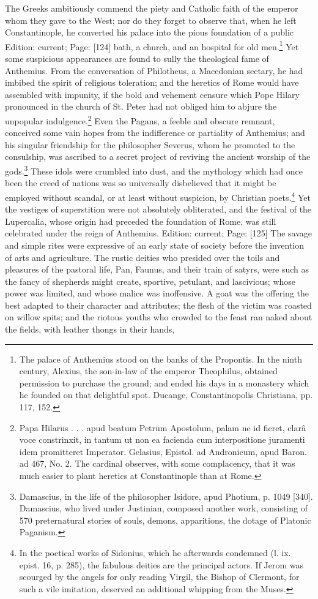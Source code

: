 The Greeks ambitiously commend the piety and Catholic faith of the emperor whom they gave to the West; nor do they forget to observe that, when he left Constantinople, he converted his palace into the pious foundation of a public Edition: current; Page: [124] bath, a church, and an hospital for old men.\footnote{The palace of Anthemius stood on the banks of the Propontis. In the ninth century, Alexius, the son-in-law of the emperor Theophilus, obtained permission to purchase the ground; and ended his days in a monastery which he founded on that delightful spot. Ducange, Constantinopolis Christiana, pp. 117, 152.} Yet some suspicious appearances are found to sully the theological fame of Anthemius. From the conversation of Philotheus, a Macedonian sectary, he had imbibed the spirit of religious toleration; and the heretics of Rome would have assembled with impunity, if the bold and vehement censure which Pope Hilary pronounced in the church of St. Peter had not obliged him to abjure the unpopular indulgence.\footnote{Papa Hilarus . . . apud beatum Petrum Apostolum, palam ne id fieret, clarâ voce constrinxit, in tantum ut non ea facienda cum interpositione juramenti idem promitteret Imperator. Gelasius, Epistol. ad Andronicum, apud Baron. ad 467, No. 2. The cardinal observes, with some complacency, that it was much easier to plant heretics at Constantinople than at Rome.} Even the Pagans, a feeble and obscure remnant, conceived some vain hopes from the indifference or partiality of Anthemius; and his singular friendship for the philosopher Severus, whom he promoted to the consulship, was ascribed to a secret project of reviving the ancient worship of the gods.\footnote{Damascius, in the life of the philosopher Isidore, apud Photium, p. 1049 [340]. Damascius, who lived under Justinian, composed another work, consisting of 570 preternatural stories of souls, demons, apparitions, the dotage of Platonic Paganism.} These idols were crumbled into dust, and the mythology which had once been the creed of nations was so universally disbelieved that it might be employed without scandal, or at least without suspicion, by Christian poets.\footnote{In the poetical works of Sidonius, which he afterwards condemned (l. ix. epist. 16, p. 285), the fabulous deities are the principal actors. If Jerom was scourged by the angels for only reading Virgil, the Bishop of Clermont, for such a vile imitation, deserved an additional whipping from the Muses.} Yet the vestiges of superstition were not absolutely obliterated, and the festival of the Lupercalia, whose origin had preceded the foundation of Rome, was still celebrated under the reign of Anthemius. Edition: current; Page: [125] The savage and simple rites were expressive of an early state of society before the invention of arts and agriculture. The rustic deities who presided over the toils and pleasures of the pastoral life, Pan, Faunus, and their train of satyrs, were such as the fancy of shepherds might create, sportive, petulant, and lascivious; whose power was limited, and whose malice was inoffensive. A goat was the offering the best adapted to their character and attributes; the flesh of the victim was roasted on willow spits; and the riotous youths who crowded to the feast ran naked about the fields, with leather thongs in their hands, 